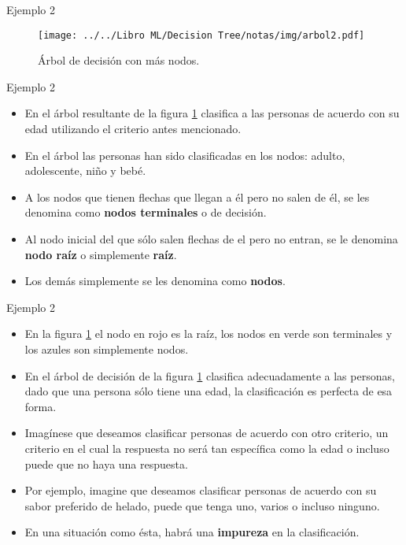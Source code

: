 \documentclass[11pt,aspectratio=169]{beamer}
\begin{document}
\begin{frame}{Ejemplo 2}
	\begin{figure}[H]
		\centering
		\texttt{[image: ../../Libro ML/Decision Tree/notas/img/arbol2.pdf]}
		\caption{Árbol de decisión con más nodos.}
		\label{fig:arbol2}
	\end{figure}
\end{frame}

\begin{frame}{Ejemplo 2}
	\begin{itemize}
		\item En el árbol resultante de la figura \ref{fig:arbol2} clasifica a las personas de acuerdo con su edad 
			utilizando el criterio antes mencionado. \pause
		\item En el árbol las personas han sido clasificadas en los nodos: adulto, adolescente, niño y bebé.\pause
		\item A los nodos que tienen flechas que llegan a él pero no salen de él, se les denomina como 
			\textbf{nodos terminales} o de decisión.\pause
		\item Al nodo inicial del que sólo salen flechas de el pero no entran, se le denomina \textbf{nodo raíz} 
			o simplemente \textbf{raíz}.\pause
		\item Los demás simplemente se les denomina como \textbf{nodos}. 
	\end{itemize}
\end{frame}

\begin{frame}{Ejemplo 2}
	\begin{itemize}
		\item En la figura \ref{fig:arbol2} el nodo en rojo es la raíz, los nodos en verde son terminales y los 
			azules son simplemente nodos.\pause
		\item En el árbol de decisión de la figura \ref{fig:arbol2} clasifica adecuadamente a las personas, 
			dado que una persona sólo tiene una edad, la clasificación es perfecta de esa forma.\pause
		\item Imagínese que deseamos clasificar personas de acuerdo con otro criterio, un criterio en el cual 
			la respuesta no será tan específica como la edad o incluso puede que no haya una respuesta.\pause
		\item Por ejemplo, imagine que deseamos clasificar personas de acuerdo con su sabor preferido de helado,
			puede que tenga uno, varios o incluso ninguno.\pause
		\item En una situación como ésta, habrá una \textbf{impureza} en la clasificación. 
	\end{itemize}
\end{frame}
\end{document}

